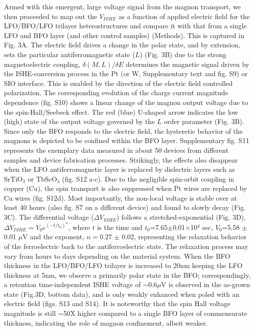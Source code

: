 \documentclass[12pt]{article}
\begin{document}
Armed with this emergent, large voltage signal from the magnon transport, we then proceeded to map out the $V_{ISHE}$ as a function of applied electric field for the LFO/BFO/LFO trilayer heterostructures and compare it with that from a single LFO and BFO layer (and other control samples) (Methods). %
This is captured in Fig. 3A. The electric field drives a change in the polar state, and by extension, sets the particular antiferromagnetic state ($L$) (Fig. 3B) due to the strong magnetoelectric coupling\cite{heron2014deterministic}, $\delta (M,L)/\delta E$ determines the magnetic signal driven by the ISHE-conversion process in the Pt (or W,  Supplementary text and fig. S9) or SIO interface. This is enabled by the direction of the electric field controlled polarization. The corresponding evolution of the charge current magnitude dependence (fig. S10) shows a linear change of the magnon output voltage due to the spin-Hall/Seebeck effect. 
The red (blue) U-shaped arrow indicates the low (high) state of the output voltage governed by the $L$ order parameter (Fig. 3B). Since only the BFO responds to the electric field, the hysteretic behavior of the magnons is depicted to be confined within the BFO layer. Supplementary fig. S11 represents the exemplary data measured in about 50 devices from different samples and device fabrication processes. Strikingly, the effects also disappear when the LFO antiferromagnetic layer is replaced by dielectric layers such as SrTiO$_3$ or TbScO$_3$ (fig. S12 a-c). Due to the negligible spin-orbit coupling in copper (Cu), the spin transport is also suppressed when Pt wires are replaced by Cu wires (fig. S12d). Most importantly, the non-local voltage is stable over at least 40 hours (also fig. S7 on a different device) and found to slowly decay (Fig. 3C). The differential voltage ($\Delta V_{ISHE}$) follows a stretched-exponential \cite{kohlrausch1854theorie} (Fig. 3D), $\Delta V_{ISHE} = V_{0} e^{{(-t/t_{0})}^n}$, where $t$ is the time and $t_0$=7.65$\pm$0.01$\times$10$^4$ sec, $V_0$=5.58 $\pm$ 0.01 $\mu$V and the exponent, $n=0.27 $ $\pm$ 0.02, representing the relaxation behavior of the ferroelectric back to the antiferroelectric state\cite{he2007raman,tan2014transformation,ishchuk2000peculiarities}. The relaxation process may vary from hours to days depending on the material system\cite{nadaud2023study,faye2014non,mundy2022liberating,caretta2023non}.  When the BFO thickness in the LFO/BFO/LFO trilayer is increased to 20nm keeping the LFO thickness at 5nm, we observe a primarily polar state in the BFO; correspondingly, a retention time-independent ISHE voltage of $\sim$0.6$\mu$V is observed in the as-grown state (Fig.3D, bottom data), and is only weakly enhanced when poled with an electric field (figs. S13 and S14). It is noteworthy that the spin Hall voltage magnitude is still $\sim$50X higher compared to a single BFO layer of commensurate thickness, indicating the role of magnon confinement, albeit weaker.
\end{document}

